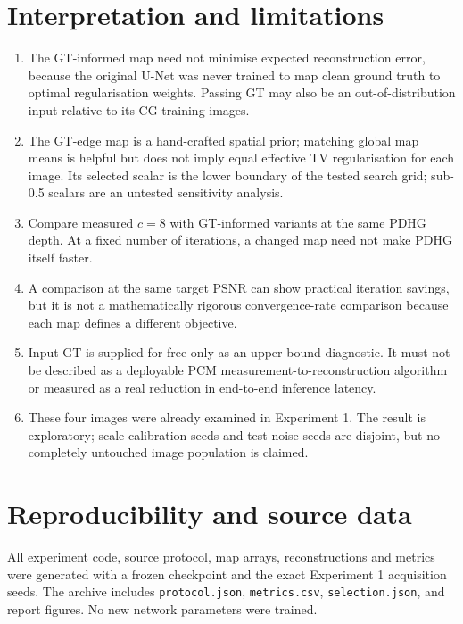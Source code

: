 \documentclass[11pt,a4paper]{article}
\begin{document}
\section{Interpretation and limitations}
\begin{enumerate}
\item The GT-informed map need not minimise expected reconstruction error, because the original U-Net was never trained to map clean ground truth to optimal regularisation weights. Passing GT may also be an out-of-distribution input relative to its CG training images.
\item The GT-edge map is a hand-crafted spatial prior; matching global map means is helpful but does not imply equal effective TV regularisation for each image. Its selected scalar is the lower boundary of the tested search grid; sub-0.5 scalars are an untested sensitivity analysis.
\item Compare measured $c=8$ with GT-informed variants at the same PDHG depth. At a fixed number of iterations, a changed map need not make PDHG itself faster.
\item A comparison at the same target PSNR can show practical iteration savings, but it is not a mathematically rigorous convergence-rate comparison because each map defines a different objective.
\item Input GT is supplied for free only as an upper-bound diagnostic. It must not be described as a deployable PCM measurement-to-reconstruction algorithm or measured as a real reduction in end-to-end inference latency.
\item These four images were already examined in Experiment 1. The result is exploratory; scale-calibration seeds and test-noise seeds are disjoint, but no completely untouched image population is claimed.
\end{enumerate}
\section{Reproducibility and source data}
All experiment code, source protocol, map arrays, reconstructions and metrics were generated with a frozen checkpoint and the exact Experiment 1 acquisition seeds. The archive includes \texttt{protocol.json}, \texttt{metrics.csv}, \texttt{selection.json}, and report figures. No new network parameters were trained.
\end{document}
